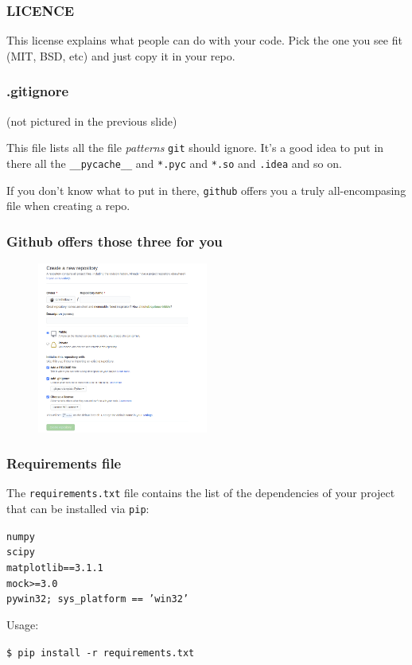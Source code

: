 \documentclass[compress,english,aspectratio=1610]{beamer}
\begin{document}
\begin{frame}[fragile]
  \frametitle{LICENCE}
  This license explains what people can do with your code. Pick the one you see fit (MIT, BSD, etc) and just copy it in your repo.
\end{frame}

\begin{frame}[fragile]
  \frametitle{.gitignore}
  (not pictured in the previous slide)

  This file lists all the file \textit{patterns} \texttt{git} should ignore. It's a good idea to put in there all the \texttt{\_\_pycache\_\_} and \texttt{*.pyc} and \texttt{*.so} and \texttt{.idea} and so on.

  If you don't know what to put in there, \texttt{github} offers you a truly all-encompasing file when creating a repo.
\end{frame}

\begin{frame}[fragile]
\frametitle{Github offers those three for you}
  \begin{figure}
    \includegraphics[width=0.5\textwidth]{figures/new_repo_form.png}
  \end{figure}
\end{frame}


\begin{frame}[fragile]
  \frametitle{Requirements file}
  The {\tt requirements.txt} file contains the list of the dependencies of your project that can be installed via {\tt pip}:
  \begin{tcolorbox}[colback=mpg-gray,colframe=mpg-green,title=Contents of requirements file]
	{\tt numpy}\\
	{\tt scipy}\\
	{\tt matplotlib==3.1.1}\\
	{\tt mock>=3.0}\\
	{\tt pywin32; sys\_platform == 'win32'}
  \end{tcolorbox}

  Usage:
  \begin{tcolorbox}[colback=mpg-gray,colframe=mpg-green,title=Commands]
	{\tt \$ pip install -r requirements.txt}
  \end{tcolorbox}
\end{frame}
\end{document}
